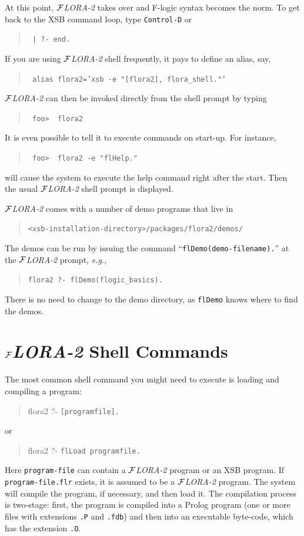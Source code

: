 \documentclass[11pt]{article}
\newcommand{\FLORA}{{\mbox{${\cal F}${\small\it LORA}\rm\emph{-2}}}\xspace}
\newcommand{\fl}{\mbox{F-logic}\xspace}
\begin{document}
At this point, \FLORA takes over and \fl syntax becomes the
norm. To get back to the XSB command loop, type {\tt Control-D} or 
\begin{quote}
  \tt
| ?- end.  
\end{quote}

If you are using \FLORA shell frequently, it pays to define an alias, say,
\begin{quote}
 {\tt
   alias flora2='xsb -e "[flora2], flora\_shell."'
   }
\end{quote}
\FLORA can then be invoked directly from the shell prompt by typing
\begin{quote}
  \tt
foo>~~flora2
\end{quote}
It is even possible to tell it to execute commands on start-up.
For instance, 
\begin{quote}
 \tt
 foo>~~flora2 -e "flHelp."
\end{quote}
will cause the system to execute the help command right after the start.
Then the usual \FLORA shell prompt is displayed.

\noindent
\FLORA comes with a number of demo programs that live in
\begin{quote}
 \verb|<xsb-installation-directory>/packages/flora2/demos/|  
\end{quote}
The demos can be run by issuing the command
``\verb|flDemo(demo-filename).|''
at the \FLORA prompt, {\it e.g.},
\begin{quote}
 \verb|flora2 ?- flDemo(flogic_basics).|
\end{quote}
There is no need to change to the demo directory, as {\tt flDemo} knows
where to find the demos.


\section{\FLORA Shell Commands} \label{sec-shell-commands}

The most common shell command you might need to execute is loading and
compiling a program:
\begin{quote}
  flora2 ?-  {\tt [programfile].}
\end{quote}
or 
\begin{quote}
  flora2 ?- {\tt flLoad programfile.}
\end{quote}
Here {\tt program-file} can contain a \FLORA program or an XSB program. If
{\tt program-file.flr} exists, it is assumed to be a \FLORA program. The
system will compile the program, if necessary, and then load it. The
compilation process is two-stage: first, the program is compiled into a
Prolog program (one or more files with extensions {\tt .P} and {\tt .fdb})
and then into an executable byte-code, which has the extension {\tt .O}.
\end{document}
